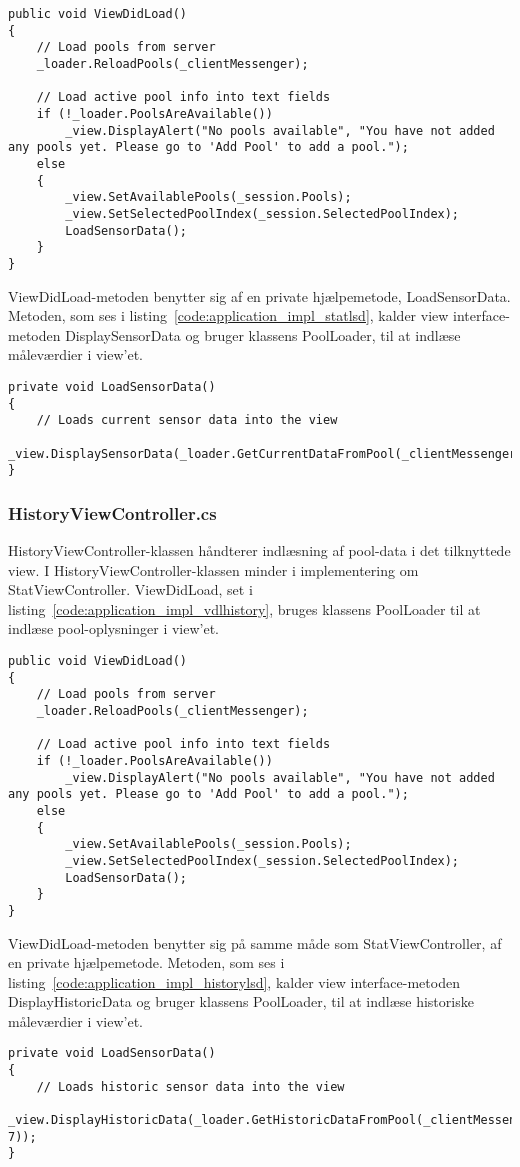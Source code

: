 \begin{lstlisting}[caption={ViewDidLoad() in StatViewController},label={code:application_impl_vdlstat}]
public void ViewDidLoad()
{
	// Load pools from server
	_loader.ReloadPools(_clientMessenger);

	// Load active pool info into text fields
	if (!_loader.PoolsAreAvailable())
		_view.DisplayAlert("No pools available", "You have not added any pools yet. Please go to 'Add Pool' to add a pool.");
	else
	{
		_view.SetAvailablePools(_session.Pools);
		_view.SetSelectedPoolIndex(_session.SelectedPoolIndex);
		LoadSensorData();
	}
}
\end{lstlisting}

ViewDidLoad-metoden benytter sig af en private hjælpemetode, LoadSensorData. Metoden, som ses i listing~\ref{code:application_impl_statlsd}, kalder view interface-metoden DisplaySensorData og bruger klassens PoolLoader, til at indlæse måleværdier i view'et.

\begin{lstlisting}[caption={LoadSensorData() in StatViewController},label={code:application_impl_statlsd}]
private void LoadSensorData()
{
	// Loads current sensor data into the view
	_view.DisplaySensorData(_loader.GetCurrentDataFromPool(_clientMessenger));
}
\end{lstlisting}

\subsubsection{HistoryViewController.cs}
HistoryViewController-klassen håndterer indlæsning af pool-data i det tilknyttede view. I HistoryViewController-klassen minder i implementering om StatViewController. ViewDidLoad, set i listing~\ref{code:application_impl_vdlhistory}, bruges klassens PoolLoader til at indlæse pool-oplysninger i view'et.

\begin{lstlisting}[caption={ViewDidLoad() in HistoryViewController},label={code:application_impl_vdlhistory}]
public void ViewDidLoad()
{
	// Load pools from server
	_loader.ReloadPools(_clientMessenger);

	// Load active pool info into text fields
	if (!_loader.PoolsAreAvailable())
		_view.DisplayAlert("No pools available", "You have not added any pools yet. Please go to 'Add Pool' to add a pool.");
	else
	{
		_view.SetAvailablePools(_session.Pools);
		_view.SetSelectedPoolIndex(_session.SelectedPoolIndex);
		LoadSensorData();
	}
}
\end{lstlisting}

ViewDidLoad-metoden benytter sig på samme måde som StatViewController, af en private hjælpemetode. Metoden, som ses i listing~\ref{code:application_impl_historylsd}, kalder view interface-metoden DisplayHistoricData og bruger klassens PoolLoader, til at indlæse historiske måleværdier i view'et.

\begin{lstlisting}[caption={LoadSensorData() in HistoryViewController},label={code:application_impl_historylsd}]
private void LoadSensorData()
{
	// Loads historic sensor data into the view
	_view.DisplayHistoricData(_loader.GetHistoricDataFromPool(_clientMessenger, 7));
}
\end{lstlisting}